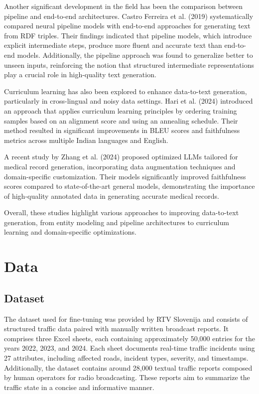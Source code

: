 \documentclass[fleqn,moreauthors,10pt]{ds_report}
\begin{document}
Another significant development in the field has been the comparison between pipeline and end-to-end architectures. Castro Ferreira et al. (2019) \cite{ferreira2019neuraldatatotextgenerationcomparison} systematically compared neural pipeline models with end-to-end approaches for generating text from RDF triples. Their findings indicated that pipeline models, which introduce explicit intermediate steps, produce more fluent and accurate text than end-to-end models. Additionally, the pipeline approach was found to generalize better to unseen inputs, reinforcing the notion that structured intermediate representations play a crucial role in high-quality text generation.

Curriculum learning has also been explored to enhance data-to-text generation, particularly in cross-lingual and noisy data settings. Hari et al. (2024) \cite{hari2024curriculumlearningcrosslingualdatatotext} introduced an approach that applies curriculum learning principles by ordering training samples based on an alignment score and using an annealing schedule. Their method resulted in significant improvements in BLEU scores and faithfulness metrics across multiple Indian languages and English.

A recent study by Zhang et al. (2024) \cite{zhang2025data} proposed optimized LLMs tailored for medical record generation, incorporating data augmentation techniques and domain-specific customization. Their models significantly improved faithfulness scores compared to state-of-the-art general models, demonstrating the importance of high-quality annotated data in generating accurate medical records. 

Overall, these studies highlight various approaches to improving data-to-text generation, from entity modeling and pipeline architectures to curriculum learning and domain-specific optimizations. 

\section*{Data}

\subsection*{Dataset}

The dataset used for fine-tuning was provided by RTV Slovenija and consists of structured traffic data paired with manually written broadcast reports. It comprises three Excel sheets, each containing approximately 50,000 entries for the years 2022, 2023, and 2024. Each sheet documents real-time traffic incidents using 27 attributes, including affected roads, incident types, severity, and timestamps. Additionally, the dataset contains around 28,000 textual traffic reports composed by human operators for radio broadcasting. These reports aim to summarize the traffic state in a concise and informative manner.
\end{document}
